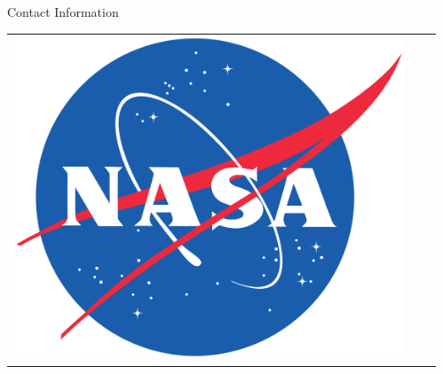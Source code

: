 \documentclass[final]{beamer}
\newlength{\sepwid}
\newlength{\onecolwid}
\begin{document}
\begin{frame}[t]
\begin{columns}[t]
\begin{column}{\onecolwid}
\begin{alertblock}{Contact Information}
\end{alertblock}

\begin{center}
\begin{tabular}{ccc}
\includegraphics[width=0.4\linewidth]{NASA_logo.png} & \hfill 
\end{tabular}
\end{center}


\end{column} %
\begin{column}{\sepwid}\end{column} %
\end{columns} %

\end{frame} %
\end{document}
